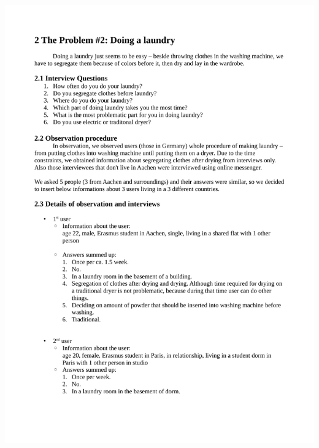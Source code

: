 \documentclass[a4paper,11pt,oneside]{scrreprt}
\begin{document}
\vspace{-2cm}
\includegraphics[page=2, trim={2cm 0cm 0cm 0cm}]{Laundry.pdf}
\end{document}
